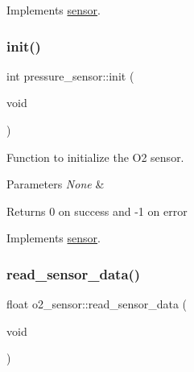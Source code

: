 Implements \hyperlink{classsensor_aae55152b437f83053eb018b5ebac874e}{sensor}.

\mbox{\label{group___ventilator_module_ga12b267b360a27d82a85f0b5276d433ed}} 
\subsubsection{\texorpdfstring{init()}{init()}\hspace{0.1cm}{\footnotesize\ttfamily [2/2]}}
{\footnotesize\ttfamily int pressure\+\_\+sensor\+::init (\begin{DoxyParamCaption}\item[{void}]{ }\end{DoxyParamCaption})\hspace{0.3cm}{\ttfamily [virtual]}}



Function to initialize the O2 sensor. 


\begin{DoxyParams}{Parameters}
{\em None} & \\
\hline
\end{DoxyParams}
\begin{DoxyReturn}{Returns}
0 on success and -\/1 on error 
\end{DoxyReturn}


Implements \hyperlink{classsensor_aae55152b437f83053eb018b5ebac874e}{sensor}.

\mbox{\label{group___ventilator_module_ga9601927ed36f205bdc9a8dfb55cf9657}} 
\subsubsection{\texorpdfstring{read\+\_\+sensor\+\_\+data()}{read\_sensor\_data()}\hspace{0.1cm}{\footnotesize\ttfamily [1/3]}}
{\footnotesize\ttfamily float o2\+\_\+sensor\+::read\+\_\+sensor\+\_\+data (\begin{DoxyParamCaption}\item[{void}]{ }\end{DoxyParamCaption})\hspace{0.3cm}{\ttfamily [virtual]}}



